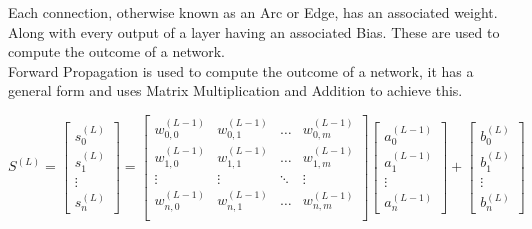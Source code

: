 \begin{flushleft}
                    Each connection, otherwise known as an Arc or Edge, has an associated weight. Along with every output of a
                    layer having an associated Bias. These are used to compute the outcome of a network. \\
                    \vspace{0.2cm}
                    Forward Propagation is used to compute the outcome of a network, it has a general form and uses 
                    Matrix Multiplication and Addition to achieve this.
                    \vspace{0.2cm}
                    
                    \begin{center}
                        $
                        S^{(L)} = 
                        \begin{bmatrix}
                        s^{(L)}_{0} \\
                        s^{(L)}_{1} \\
                        \vdots      \\
                        s^{(L)}_{n} 
                        \end{bmatrix}
                        = 
                        \begin{bmatrix}
                        w^{(L-1)}_{0,0} & w^{(L-1)}_{0,1} & \hdots  & w^{(L-1)}_{0,m} \\
                        w^{(L-1)}_{1,0} & w^{(L-1)}_{1,1} & \hdots  & w^{(L-1)}_{1,m} \\
                        \vdots          & \vdots          & \ddots  & \vdots          \\
                        w^{(L-1)}_{n,0} & w^{(L-1)}_{n,1} & \hdots  & w^{(L-1)}_{n,m} \\
                        \end{bmatrix}
                        \begin{bmatrix}
                        a^{(L-1)}_{0} \\
                        a^{(L-1)}_{1} \\
                        \vdots      \\
                        a^{(L-1)}_{n} 
                        \end{bmatrix}
                        +
                        \begin{bmatrix}
                        b^{(L)}_{0} \\
                        b^{(L)}_{1} \\
                        \vdots      \\
                        b^{(L)}_{n} 
                        \end{bmatrix}
                        $ 
                    \end{center}
                    

\end{flushleft}
